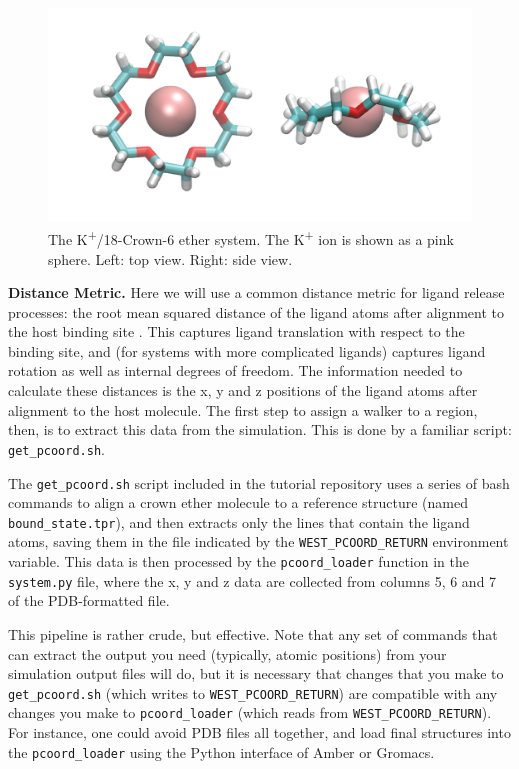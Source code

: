 \documentclass[9pt,tutorial,pubversion]{livecoms}
\begin{document}
\begin{figure}
\includegraphics[width=\linewidth]{Figure12.png}
\caption{The K\textsuperscript{+}/18-Crown-6 ether system. 
The K\textsuperscript{+} ion is shown as a pink sphere. Left: top view. Right: side view.}
\label{fig:view}
\end{figure}

\textbf{Distance Metric.} Here we will use a common distance metric for ligand release processes: the root mean squared distance of the ligand atoms after alignment to the host binding site \citep{Dickson2017,Dixon2018,Dickson2018}.
This captures ligand translation with respect to the binding site, and (for systems with more complicated ligands) captures ligand rotation as well as internal degrees of freedom. 
The information needed to calculate these distances is the x, y and z positions of the ligand atoms after alignment to the host molecule. 
The first step to assign a walker to a region, then, is to extract this data from the simulation. 
This is done by a familiar script: \verb|get_pcoord.sh|.

The \verb|get_pcoord.sh| script included in the tutorial repository uses a series of bash commands to align a crown ether molecule to a reference structure (named \verb|bound_state.tpr|), and then extracts only the lines that contain the ligand atoms, saving them in the file indicated by the \verb|WEST_PCOORD_RETURN| environment variable. 
This data is then processed by the \verb|pcoord_loader| function in the \verb|system.py| file, where the x, y and z data are collected from columns 5, 6 and 7 of the PDB-formatted file. 

This pipeline is rather crude, but effective. 
Note that any set of commands that can extract the output you need (typically, atomic positions) from your simulation output files will do, but it is necessary that changes that you make to \verb|get_pcoord.sh| (which writes to \verb|WEST_PCOORD_RETURN|) are compatible with any changes you make to \verb|pcoord_loader| (which reads from \verb|WEST_PCOORD_RETURN|). 
For instance, one could avoid PDB files all together, and load final structures into the \verb|pcoord_loader| using the Python interface of Amber or Gromacs.
\end{document}
